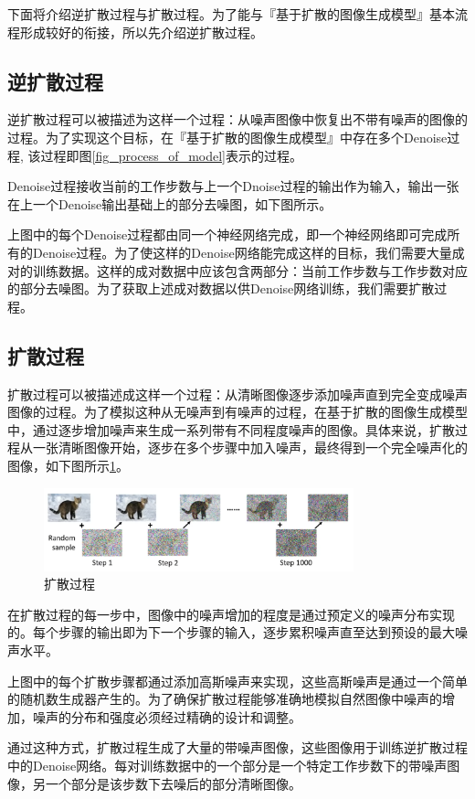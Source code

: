下面将介绍逆扩散过程与扩散过程。为了能与『基于扩散的图像生成模型』基本流程形成较好的衔接，所以先介绍逆扩散过程。

\subsection{逆扩散过程}
\label{sec_inverse}

逆扩散过程可以被描述为这样一个过程：从噪声图像中恢复出不带有噪声的图像的过程。为了实现这个目标，在『基于扩散的图像生成模型』中存在多个Denoise过程, 该过程即图\ref{fig_process_of_model}表示的过程。

Denoise过程接收当前的工作步数与上一个Dnoise过程的输出作为输入，输出一张在上一个Denoise输出基础上的部分去噪图，如下图所示。

上图中的每个Denoise过程都由同一个神经网络完成，即一个神经网络即可完成所有的Denoise过程。为了使这样的Denoise网络能完成这样的目标，我们需要大量成对的训练数据。这样的成对数据中应该包含两部分：当前工作步数与工作步数对应的部分去噪图。为了获取上述成对数据以供Denoise网络训练，我们需要扩散过程。

\subsection{扩散过程}

扩散过程可以被描述成这样一个过程：从清晰图像逐步添加噪声直到完全变成噪声图像的过程。为了模拟这种从无噪声到有噪声的过程，在基于扩散的图像生成模型中，通过逐步增加噪声来生成一系列带有不同程度噪声的图像。具体来说，扩散过程从一张清晰图像开始，逐步在多个步骤中加入噪声，最终得到一个完全噪声化的图像，如下图所示\ref{fig_kuosan}。

\begin{figure}[htbp]
    \centering
    \includegraphics[width=0.8\textwidth]{figs/color/kosan.png}
    \caption{扩散过程}
    \label{fig_kuosan}
\end{figure}

在扩散过程的每一步中，图像中的噪声增加的程度是通过预定义的噪声分布实现的。每个步骤的输出即为下一个步骤的输入，逐步累积噪声直至达到预设的最大噪声水平。

上图中的每个扩散步骤都通过添加高斯噪声来实现，这些高斯噪声是通过一个简单的随机数生成器产生的。为了确保扩散过程能够准确地模拟自然图像中噪声的增加，噪声的分布和强度必须经过精确的设计和调整。

通过这种方式，扩散过程生成了大量的带噪声图像，这些图像用于训练逆扩散过程中的Denoise网络。每对训练数据中的一个部分是一个特定工作步数下的带噪声图像，另一个部分是该步数下去噪后的部分清晰图像。